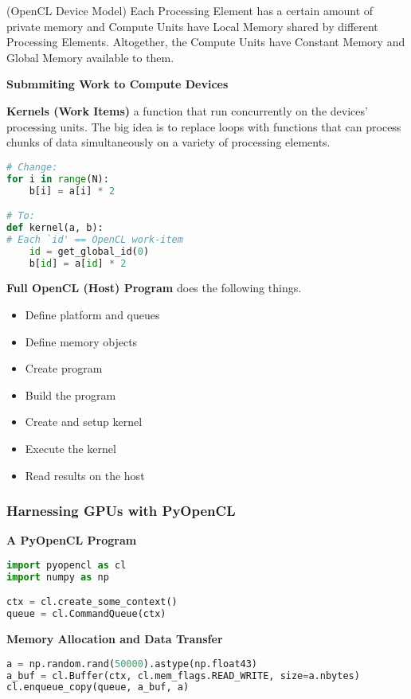 \documentclass{article}
\begin{document}
(OpenCL Device Model) Each Processing Element has a certain amount of private memory and Compute Units have Local Memory shared by different Processing Elements. Altogether, the Compute Units have Constant Memory and Global Memory available to them. 

\textbf{Submmiting Work to Compute Devices}

\textbf{Kernels (Work Items)} a function that run concurrently on the devices' processing units. The big idea is to replace loops with functions that can process chunks of data simultaneously on a variety of processing elements.

\begin{lstlisting}[language=Python]
# Change:
for i in range(N):
    b[i] = a[i] * 2

# To:
def kernel(a, b):
# Each `id' == OpenCL work-item
    id = get_global_id(0)
    b[id] = a[id] * 2
\end{lstlisting}

\textbf{Full OpenCL (Host) Program} does the following things.

\begin{itemize}
    \item Define platform and queues
    \item Define memory objects
    \item Create program
    \item Build the program
    \item Create and setup kernel
    \item Execute the kernel
    \item Read results on the host
\end{itemize}

\subsubsection{Harnessing GPUs with PyOpenCL}

\textbf{A PyOpenCL Program}

\begin{lstlisting}[language=Python]
import pyopencl as cl
import numpy as np

ctx = cl.create_some_context()
queue = cl.CommandQueue(ctx)
\end{lstlisting}

\textbf{Memory Allocation and Data Transfer}

\begin{lstlisting}[language=Python]
a = np.random.rand(50000).astype(np.float43)
a_buf = cl.Buffer(ctx, cl.mem_flags.READ_WRITE, size=a.nbytes)
cl.enqueue_copy(queue, a_buf, a)
\end{lstlisting}
\end{document}
